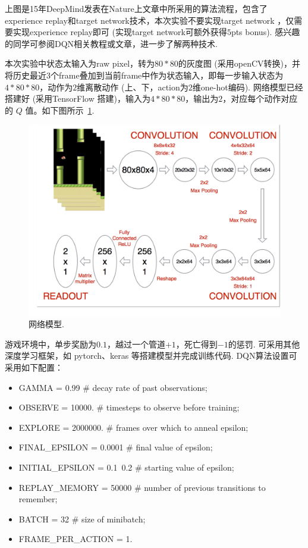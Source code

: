 \documentclass[a4paper,UTF8]{article}
\numberwithin{equation}{section}
\begin{document}
上图是15年DeepMind发表在Nature上文章中所采用的算法流程，包含了 experience replay和target network技术，本次实验不要实现target network ，仅需要实现experience replay即可 (实现target network可额外获得$5$pts bonus). 感兴趣的同学可参阅DQN相关教程或文章，进一步了解两种技术. 

本次实验中状态太输入为raw pixel，转为$80*80$的灰度图 (采用openCV转换)，并将历史最近$3$个frame叠加到当前frame中作为状态输入，即每一步输入状态为$4*80*80$，动作为$2$维离散动作 (上、下，action为$2$维one-hot编码). 网络模型已经搭建好 (采用TensorFlow 搭建)，输入为$4*80*80$，输出为$2$，对应每个动作对应的 $Q$ 值。如下图所示~\ref{fig:rl_1}.
\begin{figure}[!htb]
	\centering
	\includegraphics[scale=0.4]{rl_1.png}
	\caption{网络模型.}
	\label{fig:rl_1}
\end{figure}

游戏环境中，单步奖励为$0.1$，越过一个管道$+1$，死亡得到$-1$的惩罚. 可采用其他深度学习框架，如 pytorch、keras 等搭建模型并完成训练代码. DQN算法设置可采用如下配置：
\begin{itemize}
	\item GAMMA = 0.99 \# decay rate of past observations;
	\item OBSERVE = 10000. \# timesteps to observe before training;
	\item EXPLORE = 2000000. \# frames over which to anneal epsilon;
	\item FINAL\_EPSILON = 0.0001 \# final value of epsilon;
	\item INITIAL\_EPSILON = 0.1~0.2 \# starting value of epsilon;
	\item REPLAY\_MEMORY = 50000 \# number of previous transitions to remember;
	\item BATCH = 32 \# size of minibatch;
	\item FRAME\_PER\_ACTION = 1.
\end{itemize}
\end{document}

